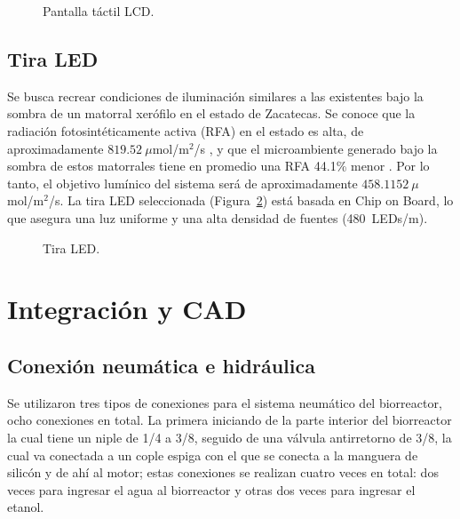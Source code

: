 \documentclass[11pt,tesis,twoside,openright,spanish]{upiiztt}
\begin{document}
\begin{figure}[H]
  \centering
  \caption{Pantalla táctil LCD.}
  \label{fig:pantalla}
\end{figure}

\subsection{Tira LED}

Se busca recrear condiciones de iluminación similares a las existentes bajo la
sombra de un matorral xerófilo en el estado de Zacatecas. Se conoce que la
radiación fotosintéticamente activa (RFA) en el estado es alta, de aproximadamente
$819.52\ \mu$mol/m$^2$/s \cite{Escobedo2020}, y que el microambiente generado bajo la sombra de estos
matorrales tiene en promedio una RFA 44.1\% menor \cite{Sanchez2024}. Por lo tanto, el objetivo
lumínico del sistema será de aproximadamente $458.1152\ \mu$mol/m$^2$/s. La tira LED
seleccionada (Figura~\ref{fig:tira_led}) está basada en Chip on Board, lo que asegura una luz uniforme
y una alta densidad de fuentes (480~LEDs/m).

\begin{figure}[H]
  \centering
  \caption{Tira LED.}
  \label{fig:tira_led}
\end{figure}

\section{Integración y CAD}

\subsection{Conexión neumática e hidráulica}

Se utilizaron tres tipos de conexiones para el sistema neumático del biorreactor,
ocho conexiones en total. La primera iniciando de la parte interior del biorreactor la
cual tiene un niple de 1/4 a 3/8, seguido de una válvula antirretorno de 3/8, la cual
va conectada a un cople espiga con el que se conecta a la manguera de silicón y
de ahí al motor; estas conexiones se realizan cuatro veces en total: dos veces para
ingresar el agua al biorreactor y otras dos veces para ingresar el etanol.
\end{document}
